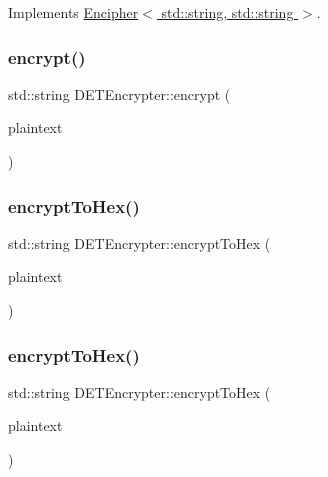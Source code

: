 Implements \hyperlink{classEncipher_aaf8138eb280608bfd03c6eb762ffc010}{Encipher$<$ std\+::string, std\+::string $>$}.

\mbox{\label{classDETEncrypter_a0755264964442bb1593cf1ffd0bbe274}} 
\subsubsection{\texorpdfstring{encrypt()}{encrypt()}\hspace{0.1cm}{\footnotesize\ttfamily [2/2]}}
{\footnotesize\ttfamily std\+::string D\+E\+T\+Encrypter\+::encrypt (\begin{DoxyParamCaption}\item[{Crypto\+P\+P\+::\+Sec\+Byte\+Block \&}]{plaintext }\end{DoxyParamCaption})}

\mbox{\label{classDETEncrypter_ad688722b05535c623af3c32548af23c9}} 
\subsubsection{\texorpdfstring{encrypt\+To\+Hex()}{encryptToHex()}\hspace{0.1cm}{\footnotesize\ttfamily [1/2]}}
{\footnotesize\ttfamily std\+::string D\+E\+T\+Encrypter\+::encrypt\+To\+Hex (\begin{DoxyParamCaption}\item[{std\+::string \&}]{plaintext }\end{DoxyParamCaption})}

\mbox{\label{classDETEncrypter_a78128a4a9df72a4199abbd06f6169c48}} 
\subsubsection{\texorpdfstring{encrypt\+To\+Hex()}{encryptToHex()}\hspace{0.1cm}{\footnotesize\ttfamily [2/2]}}
{\footnotesize\ttfamily std\+::string D\+E\+T\+Encrypter\+::encrypt\+To\+Hex (\begin{DoxyParamCaption}\item[{Crypto\+P\+P\+::\+Sec\+Byte\+Block \&}]{plaintext }\end{DoxyParamCaption})}

